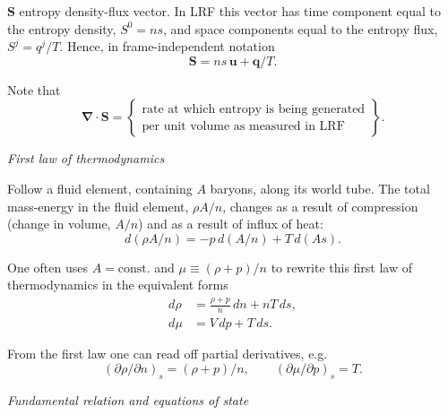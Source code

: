 \noindent
$\mathbf{S}$ \quad entropy density-flux vector.  In LRF this vector has
time component equal to the entropy density, $S^0 = ns$, and space
components equal to the entropy flux, $S^j = q^j / T$.  Hence, in
frame-independent notation
%
\begin{equation}
\tag{2.5.9}
\mathbf{S} = ns\,\mathbf{u} + \mathbf{q}/T.
\end{equation}

\noindent
Note that
%
\begin{equation}
\tag{2.5.10}
\boldsymbol{\nabla}\cdot\mathbf{S}
= \left\{
\begin{array}{l}
\text{rate at which entropy is being generated}\\
\text{per unit volume as measured in LRF}
\end{array}
\right\}.
\end{equation}

\bigskip
\noindent
\emph{First law of thermodynamics}

\smallskip
\noindent
Follow a fluid element, containing $A$ baryons, along its world tube.
The total mass-energy in the fluid element, $\rho A/n$, changes as a
result of compression (change in volume, $A/n$) and as a result of
influx of heat:
%
\begin{equation}
\tag{2.5.11}
d(\rho A/n) = -p\,d(A/n) + T\,d(As).
\end{equation}


One often uses $A = \text{const.}$ and $\mu \equiv (\rho + p)/n$ to
rewrite this first law of thermodynamics in the equivalent forms
%
\begin{align}
\tag{2.5.12}
d\rho &= \frac{\rho + p}{n}\, dn + nT\, ds, \\[4pt]
\tag{2.5.12$'$}
d\mu  &= V\, dp + T\, ds.
\end{align}

\noindent
From the first law one can read off partial derivatives, e.g.
%
\begin{equation}
\tag{2.5.12$''$}
(\partial\rho/\partial n)_s = (\rho + p)/n, \qquad
(\partial\mu/\partial p)_s = T.
\end{equation}

\bigskip
\noindent
\emph{Fundamental relation and equations of state}

